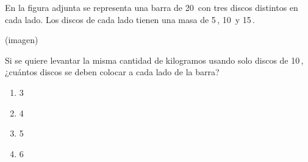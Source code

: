 \begin{problem}
    En la figura adjunta se representa una barra de 20\, con tres discos distintos en cada lado. Los discos de cada lado tienen una masa de 5\,, 10\, y 15\,.

    \begin{center}
    (imagen)
    \end{center}

    Si se quiere levantar la misma cantidad de kilogramos usando solo discos de 10\,, ¿cuántos discos se deben colocar a cada lado de la barra?

    \begin{enumerate}[label=\Alph*.]
        \item 3
        \item 4
        \item 5
        \item 6
    \end{enumerate}
\end{problem}
